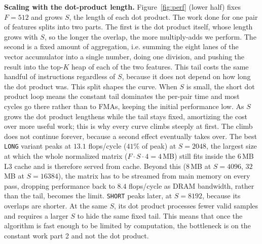 \documentclass[letterpaper]{article}
\newcommand{\mypar}[1]{{\bf #1.}}
\begin{document}
\mypar{Scaling with the dot-product length}
Figure~\ref{fig:perf} (lower half) fixes $F=512$ and grows $S$, the length of each dot product. The work done for one pair of features splits into two parts. The first is the dot product itself, whose length grows with $S$, so the longer the overlap, the more multiply-adds we perform. The second is a fixed amount of aggregation, i.e. summing the eight lanes of the vector accumulator into a single number, doing one division, and pushing the result into the top-$K$ heap of each of the two features. This tail costs the same handful of instructions regardless of $S$, because it does not depend on how long the dot product was. This split shapes the curve. When $S$ is small, the short dot product loop means the constant tail dominates the per-pair time and most cycles go there rather than to FMAs, keeping the initial performance low. As $S$ grows the dot product lengthens while the tail stays fixed, amortizing the cost over more useful work; this is why every curve climbs steeply at first. The climb does not continue forever, because a second effect eventually takes over. The best \texttt{LONG} variant peaks at $13.1$ flops/cycle ($41\%$ of peak) at $S=2048$, the largest size at which the whole normalized matrix ($F\cdot S\cdot4 = 4$\,MB) still fits inside the $6$\,MB L3 cache and is therefore served from cache. Beyond this ($8$\,MB at $S=4096$, $32$\,MB at $S=16384$), the matrix has to be streamed from main memory on every pass, dropping performance back to $8.4$ flops/cycle as DRAM bandwidth, rather than the tail, becomes the limit. \texttt{SHORT} peaks later, at $S=8192$, because its overlaps are shorter. At the same $S$, its dot product processes fewer valid samples and requires a larger $S$ to hide the same fixed tail. This means that once the algorithm is fast enough to be limited by computation, the bottleneck is on the constant work part 2 and not the dot product.
\end{document}
